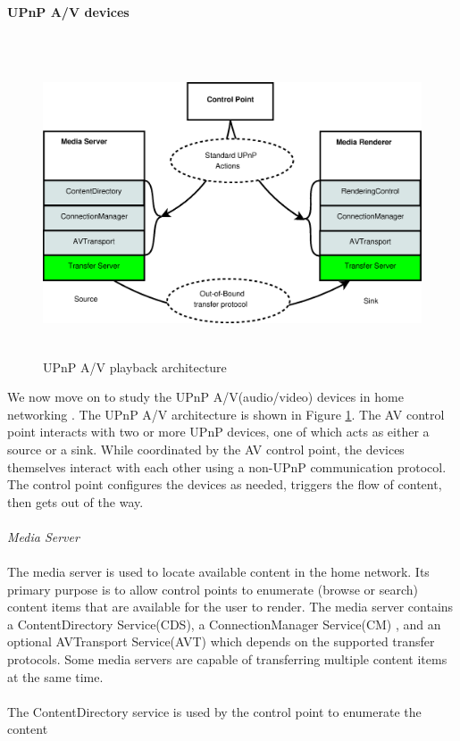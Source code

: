 \\
\textbf{UPnP A/V devices}\\
\\
\begin{figure}[hb] 
\centering \includegraphics[height=9cm]{charts/upnp_playback} 
\caption{UPnP A/V playback architecture \label{upnp_playback}} 
\end{figure}
We now move on to study the UPnP A/V(audio/video) devices in home networking
\label{upnpav}. The UPnP A/V architecture is shown in Figure
\ref{upnp_playback}. The AV control point interacts with two or more UPnP
devices, one of which acts as either a source or a sink. While coordinated by
the AV control point, the devices themselves interact with each other using a
non-UPnP communication protocol. The control point configures the devices as
needed, triggers the flow of content, then gets out of the way.\\
\\
\emph{Media Server} \\ 
\\
The media server is used to locate available content in the home network. Its 
primary purpose is to allow control points to enumerate (browse or search) 
content items that are available for the user to render. The media server 
contains a ContentDirectory Service(CDS), a ConnectionManager Service(CM) 
, and an optional AVTransport Service(AVT) which depends on the supported 
transfer protocols. Some media servers are capable of transferring multiple 
content items at the same time. \\
\\
The ContentDirectory service is used by the control point to enumerate the content 
